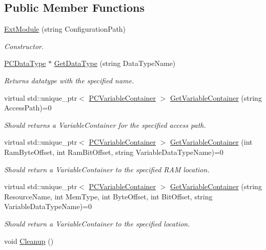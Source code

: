 \subsection*{Public Member Functions}
\begin{DoxyCompactItemize}
\item 
\hyperlink{classpc__emulator_1_1ExtModule_a968271fb30effa6ee61d1e790db702bb}{Ext\+Module} (string Configuration\+Path)\hypertarget{classpc__emulator_1_1ExtModule_a968271fb30effa6ee61d1e790db702bb}{}\label{classpc__emulator_1_1ExtModule_a968271fb30effa6ee61d1e790db702bb}

\begin{DoxyCompactList}\small\item\em Constructor. \end{DoxyCompactList}\item 
\hyperlink{classpc__emulator_1_1PCDataType}{P\+C\+Data\+Type} $\ast$ \hyperlink{classpc__emulator_1_1ExtModule_a7ea76b9a1428e26437b7736d558ab918}{Get\+Data\+Type} (string Data\+Type\+Name)
\begin{DoxyCompactList}\small\item\em Returns datatype with the specified name. \end{DoxyCompactList}\item 
virtual std\+::unique\+\_\+ptr$<$ \hyperlink{classpc__emulator_1_1PCVariableContainer}{P\+C\+Variable\+Container} $>$ \hyperlink{classpc__emulator_1_1ExtModule_a5a967d2cf1925ae2f2811892e034db14}{Get\+Variable\+Container} (string Access\+Path)=0
\begin{DoxyCompactList}\small\item\em Should returns a Variable\+Container for the specified access path. \end{DoxyCompactList}\item 
virtual std\+::unique\+\_\+ptr$<$ \hyperlink{classpc__emulator_1_1PCVariableContainer}{P\+C\+Variable\+Container} $>$ \hyperlink{classpc__emulator_1_1ExtModule_a840b25e14892e09ecca10f195cd08e6d}{Get\+Variable\+Container} (int Ram\+Byte\+Offset, int Ram\+Bit\+Offset, string Variable\+Data\+Type\+Name)=0
\begin{DoxyCompactList}\small\item\em Should return a Variable\+Container to the specified R\+AM location. \end{DoxyCompactList}\item 
virtual std\+::unique\+\_\+ptr$<$ \hyperlink{classpc__emulator_1_1PCVariableContainer}{P\+C\+Variable\+Container} $>$ \hyperlink{classpc__emulator_1_1ExtModule_ab62dc4b158134b37e1851a79e009b194}{Get\+Variable\+Container} (string Resource\+Name, int Mem\+Type, int Byte\+Offset, int Bit\+Offset, string Variable\+Data\+Type\+Name)=0
\begin{DoxyCompactList}\small\item\em Should return a Variable\+Container to the specified location. \end{DoxyCompactList}\item 
void \hyperlink{classpc__emulator_1_1ExtModule_aa54675227fb0b02e0f122ab0fa3c0641}{Cleanup} ()\hypertarget{classpc__emulator_1_1ExtModule_aa54675227fb0b02e0f122ab0fa3c0641}{}\label{classpc__emulator_1_1ExtModule_aa54675227fb0b02e0f122ab0fa3c0641}


\end{DoxyCompactItemize}
